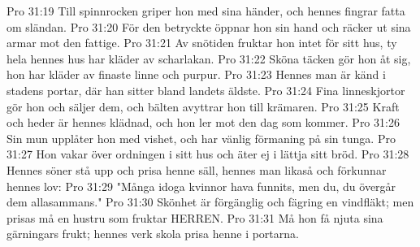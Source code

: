 Pro 31:19  Till spinnrocken griper hon med sina händer, och hennes fingrar fatta om sländan.
Pro 31:20  För den betryckte öppnar hon sin hand och räcker ut sina armar mot den fattige.
Pro 31:21  Av snötiden fruktar hon intet för sitt hus, ty hela hennes hus har kläder av scharlakan.
Pro 31:22  Sköna täcken gör hon åt sig, hon har kläder av finaste linne och purpur.
Pro 31:23  Hennes man är känd i stadens portar, där han sitter bland landets äldste.
Pro 31:24  Fina linneskjortor gör hon och säljer dem, och bälten avyttrar hon till krämaren.
Pro 31:25  Kraft och heder är hennes klädnad, och hon ler mot den dag som kommer.
Pro 31:26  Sin mun upplåter hon med vishet, och har vänlig förmaning på sin tunga.
Pro 31:27  Hon vakar över ordningen i sitt hus och äter ej i lättja sitt bröd.
Pro 31:28  Hennes söner stå upp och prisa henne säll, hennes man likaså och förkunnar hennes lov:
Pro 31:29  "Många idoga kvinnor hava funnits, men du, du övergår dem allasammans."
Pro 31:30  Skönhet är förgänglig och fägring en vindfläkt; men prisas må en hustru som fruktar HERREN.
Pro 31:31  Må hon få njuta sina gärningars frukt; hennes verk skola prisa henne i portarna.


